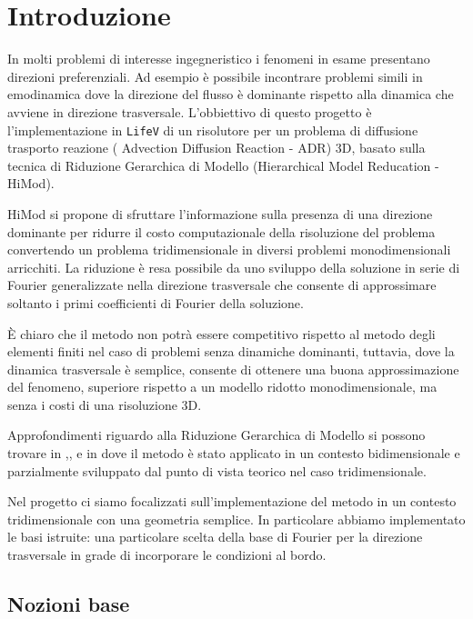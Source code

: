 \chapter{Introduzione}

In molti problemi di interesse ingegneristico i fenomeni in esame presentano
direzioni preferenziali. Ad esempio \`e possibile incontrare problemi simili in 
emodinamica dove la direzione del flusso \`e dominante rispetto alla dinamica
che avviene in direzione trasversale.
L'obbiettivo di questo progetto \`e l'implementazione in \texttt{LifeV} di un 
risolutore per un problema di diffusione trasporto reazione ( Advection Diffusion 
Reaction - ADR) 3D, basato sulla tecnica di Riduzione Gerarchica di Modello
(Hierarchical Model Reducation - HiMod).

HiMod si propone di sfruttare l'informazione
sulla presenza di una direzione dominante per ridurre il costo computazionale
della risoluzione del problema convertendo un problema tridimensionale
in diversi problemi monodimensionali arricchiti.
La riduzione \`e resa possibile da uno sviluppo della soluzione in serie di 
Fourier generalizzate nella direzione trasversale che consente di approssimare 
soltanto i primi coefficienti di Fourier della soluzione.

\`E chiaro che il metodo non potr\`a essere competitivo rispetto al
metodo degli elementi finiti nel caso di problemi senza dinamiche dominanti,
tuttavia, dove la dinamica trasversale \`e semplice, consente di ottenere
una buona approssimazione del fenomeno, superiore rispetto a un modello
ridotto monodimensionale, ma senza i costi di una risoluzione 3D.

Approfondimenti riguardo alla Riduzione Gerarchica di Modello si possono trovare in
\cite{perotto:2008},\cite{perotto:2009},\cite{perotto:2012} e in \cite{zilio:himod} dove il metodo \`e stato 
applicato in un contesto bidimensionale e parzialmente sviluppato dal punto di vista
teorico nel caso tridimensionale.

Nel progetto ci siamo focalizzati sull'implementazione del metodo in un contesto 
tridimensionale con una geometria semplice.
In particolare abbiamo implementato le basi istruite: una particolare scelta della base di Fourier
per la direzione trasversale in grade di incorporare le condizioni al bordo.


\section{Nozioni base}

